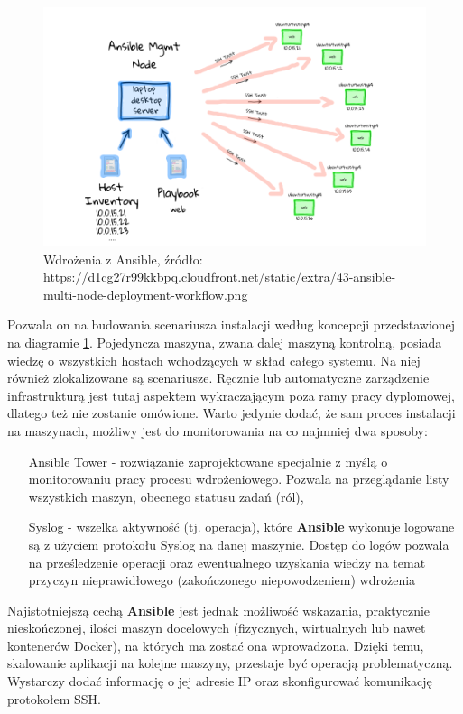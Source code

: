    \begin{figure}[H]
        \centering
        \includegraphics[width=1.0\textwidth]{images/43-ansible-multi-node-deployment-workflow}
        \caption[Wdrożenia z Ansible]{
            Wdrożenia z Ansible, 
            źródło: \url{https://d1cg27r99kkbpq.cloudfront.net/static/extra/43-ansible-multi-node-deployment-workflow.png}
        }
        \label{chapter:application:architecture:installation:ansible_diagram}
    \end{figure}
     
    Pozwala on na budowania scenariusza instalacji według koncepcji przedstawionej na diagramie 
    \ref{chapter:application:architecture:installation:ansible_diagram}. Pojedyncza maszyna, zwana dalej
    maszyną kontrolną, posiada wiedzę o wszystkich hostach wchodzących w skład całego systemu. Na niej
    również zlokalizowane są scenariusze. Ręcznie lub automatyczne zarządzenie infrastrukturą jest
    tutaj aspektem wykraczającym poza ramy pracy dyplomowej, dlatego też nie zostanie omówione. 
    Warto jedynie dodać, że sam proces instalacji na maszynach, możliwy jest do monitorowania na co najmniej
    dwa sposoby:
    
    \begin{itemize}
        \item[Ansible Tower] - rozwiązanie zaprojektowane specjalnie z myślą o monitorowaniu pracy
        procesu wdrożeniowego. Pozwala na przeglądanie listy wszystkich maszyn, obecnego statusu
        zadań (ról),
        \item[Syslog] - wszelka aktywność (tj. operacja), które \textbf{Ansible} wykonuje logowane są
        z użyciem protokołu Syslog na danej maszynie. Dostęp do logów pozwala na prześledzenie operacji oraz
        ewentualnego uzyskania wiedzy na temat przyczyn nieprawidłowego (zakończonego niepowodzeniem) wdrożenia
    \end{itemize}
    
    Najistotniejszą cechą \textbf{Ansible} jest jednak możliwość wskazania, praktycznie nieskończonej,
    ilości maszyn docelowych (fizycznych, wirtualnych lub nawet kontenerów Docker), na których ma zostać ona wprowadzona. 
    Dzięki temu, skalowanie aplikacji na kolejne maszyny, przestaje być operacją problematyczną. Wystarczy dodać 
    informację o jej adresie IP oraz skonfigurować komunikację protokołem SSH.
